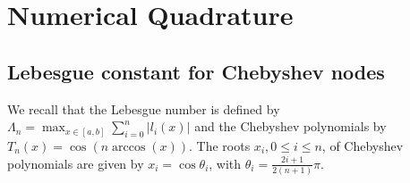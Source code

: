 \renewcommand{\chaptername}{Assignment}
\chapter{Numerical Quadrature}

\section{Lebesgue constant for Chebyshev nodes}
We recall that the Lebesgue number is defined by \(\Lambda_n=\max_{x\in[a,b]}\sum_{i=0}^{n}|l_i(x)|\) and the Chebyshev polynomials by \(T_n(x)=\cos(n\arccos(x))\).
The roots \(x_i,0\leq i\leq n\), of Chebyshev polynomials are given by \(x_i=\cos\theta_i\), with \(\theta_i=\frac{2i+1}{2(n+1)}\pi\).
